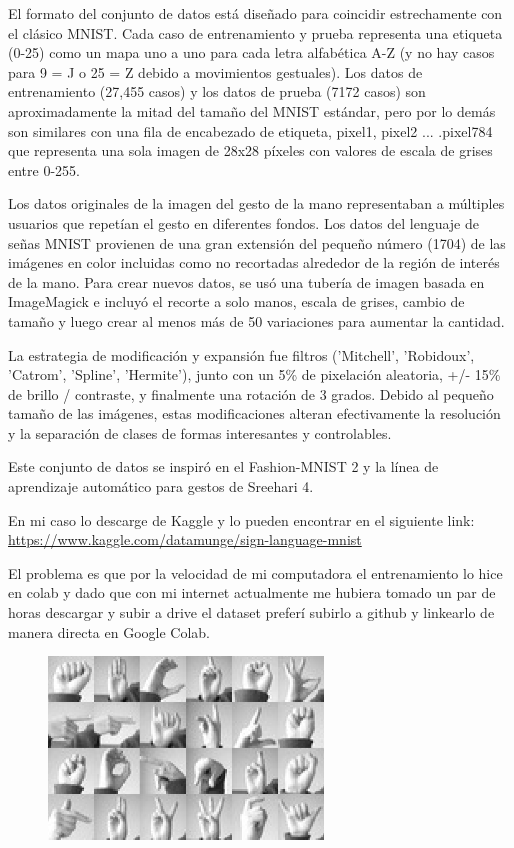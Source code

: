 \documentclass[12pt, fleqn]{report}                             %
\theoremstyle{break}                                            %
\begin{document}
        El formato del conjunto de datos está diseñado para coincidir estrechamente con el clásico MNIST.
        Cada caso de entrenamiento y prueba representa una etiqueta (0-25) como un mapa uno a uno para cada
        letra alfabética A-Z (y no hay casos para 9 = J o 25 = Z debido a movimientos gestuales).
        Los datos de entrenamiento (27,455 casos) y los datos de prueba (7172 casos) son aproximadamente la mitad
        del tamaño del MNIST estándar, pero por lo demás son similares con una fila de encabezado de etiqueta,
        pixel1, pixel2 ... .pixel784 que representa una sola imagen de 28x28 píxeles con valores de escala de
        grises entre 0-255.
        
        Los datos originales de la imagen del gesto de la mano representaban a múltiples usuarios que
        repetían el gesto en diferentes fondos. Los datos del lenguaje de señas MNIST provienen de una
        gran extensión del pequeño número (1704) de las imágenes en color incluidas como no recortadas alrededor de
        la región de interés de la mano. Para crear nuevos datos, se usó una tubería de imagen basada en ImageMagick e
        incluyó el recorte a solo manos, escala de grises, cambio de tamaño y luego crear al menos más de 50 variaciones
        para aumentar la cantidad.
        
        La estrategia de modificación y expansión fue filtros ('Mitchell', 'Robidoux', 'Catrom', 'Spline', 'Hermite'),
        junto con un 5\% de pixelación aleatoria, +/- 15\% de brillo / contraste, y finalmente una rotación de 3 grados.
        Debido al pequeño tamaño de las imágenes, estas modificaciones alteran efectivamente la resolución y
        la separación de clases de formas interesantes y controlables.
        
        Este conjunto de datos se inspiró en el Fashion-MNIST 2 y la línea de aprendizaje automático para gestos de Sreehari 4.
        
        En mi caso lo descarge de Kaggle y lo pueden encontrar en el siguiente link:
        \url{https://www.kaggle.com/datamunge/sign-language-mnist}
        
        El problema es que por la velocidad de mi computadora el entrenamiento lo hice en colab y dado que con mi internet actualmente
        me hubiera tomado un par de horas descargar y subir a drive el dataset preferí subirlo a github y linkearlo de manera
        directa en Google Colab.

        \begin{figure}[ht!]
            \centering
            \includegraphics[width=0.65\textwidth]{bnw}
        \end{figure}
\end{document}
